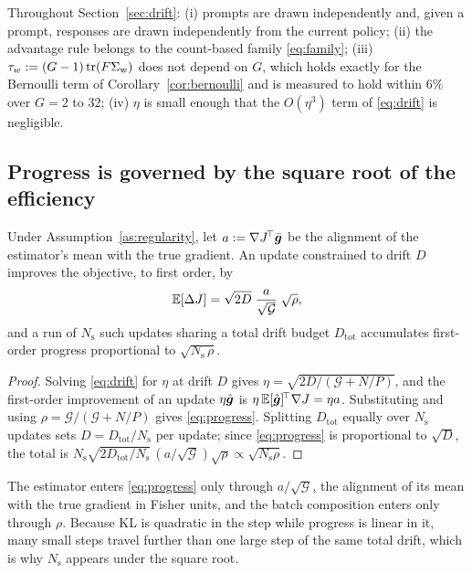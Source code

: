 \begin{assumption}[Regularity]
  \label{as:regularity}
  Throughout Section~\ref{sec:drift}: (i) prompts are drawn independently and, given a prompt,
  responses are drawn independently from the current policy; (ii) the advantage rule belongs to the
  count-based family \eqref{eq:family}; (iii) $\tau_w := (G-1)\operatorname{tr}(F\Sigma_{\mathrm{w}})$ does not depend on $G$,
  which holds exactly for the Bernoulli term of Corollary~\ref{cor:bernoulli} and is measured to
  hold within $6\%$ over $G = 2$ to $32$; (iv) $\eta$ is small enough that the $O(\eta^3)$ term of
  \eqref{eq:drift} is negligible.
\end{assumption}

\subsection{Progress is governed by the square root of the efficiency}

\begin{proposition}
  \label{prop:progress}
  Under Assumption~\ref{as:regularity}, let $a := \nabla J^{\!\top}\bar{\bm{g}}$ be the alignment of the
  estimator's mean with the true gradient. An update constrained to drift $D$ improves the
  objective, to first order, by
  \begin{equation}
    \label{eq:progress}
    \mathbb{E}[\Delta J] = \sqrt{2D}\;\frac{a}{\sqrt{\mathcal{G}}}\;\sqrt{\rho},
  \end{equation}
  and a run of $N_{\mathrm{s}}$ such updates sharing a total drift budget $D_{\mathrm{tot}}$
  accumulates first-order progress proportional to $\sqrt{N_{\mathrm{s}}\,\rho}$.
\end{proposition}

\begin{proof}
  Solving \eqref{eq:drift} for $\eta$ at drift $D$ gives
  $\eta = \sqrt{2D/(\mathcal{G} + N/P)}$, and the first-order improvement of an update
  $\eta\hat{\bm{g}}$ is $\eta\,\mathbb{E}[\hat{\bm{g}}]^{\!\top}\nabla J = \eta a$. Substituting and using
  $\rho = \mathcal{G}/(\mathcal{G}+N/P)$ gives \eqref{eq:progress}. Splitting $D_{\mathrm{tot}}$
  equally over $N_{\mathrm{s}}$ updates sets $D = D_{\mathrm{tot}}/N_{\mathrm{s}}$ per update; since
  \eqref{eq:progress} is proportional to $\sqrt{D}$, the total is
  $N_{\mathrm{s}}\sqrt{2D_{\mathrm{tot}}/N_{\mathrm{s}}}\,(a/\sqrt{\mathcal{G}})\sqrt{\rho}
  \propto \sqrt{N_{\mathrm{s}}\rho}$.
\end{proof}

The estimator enters \eqref{eq:progress} only through $a/\sqrt{\mathcal{G}}$, the alignment of
its mean with the true gradient in Fisher units, and the batch composition enters only through
$\rho$. Because KL is quadratic in the step while progress is linear in it, many small
steps travel further than one large step of the same total drift, which is why $N_{\mathrm{s}}$
appears under the square root.

